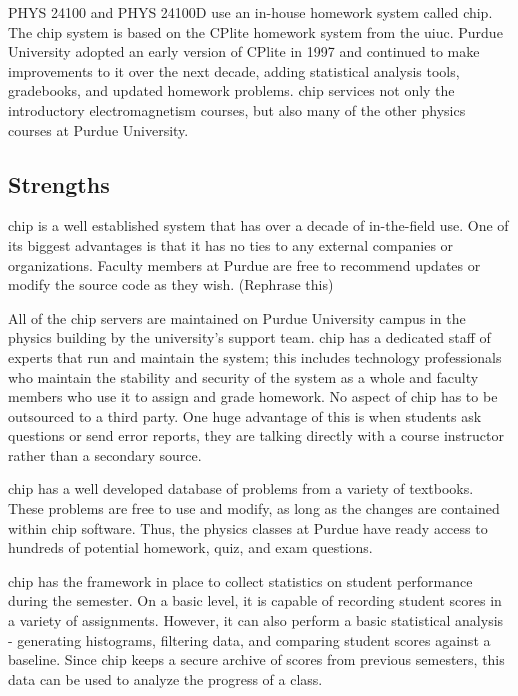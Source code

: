 PHYS 24100 and PHYS 24100D use an in-house homework system called \gls{chip}. The \gls{chip} system is based on the CPlite homework system from the \gls{uiuc}. Purdue University adopted an early version of CPlite in 1997 and continued to make improvements to it over the next decade, adding statistical analysis tools, gradebooks, and updated homework problems. \gls{chip} services not only the introductory electromagnetism courses, but also many of the other physics courses at Purdue University.

\subsection*{Strengths}

\gls{chip} is a well established system that has over a decade of in-the-field use. One of its biggest advantages is that it has no ties to any external companies or organizations. Faculty members at Purdue are free to recommend updates or modify the source code as they wish. (Rephrase this)

All of the \gls{chip} servers are maintained on Purdue University campus in the physics building by the university's support team. \gls{chip} has a dedicated staff of experts that run and maintain the system; this includes technology professionals who maintain the stability and security of the system as a whole and faculty members who use it to assign and grade homework. No aspect of \gls{chip} has to be outsourced to a third party. One huge advantage of this is when students ask questions or send error reports, they are talking directly with a course instructor rather than a secondary source.

\gls{chip} has a well developed database of problems from a variety of textbooks. These problems are free to use and modify, as long as the changes are contained within \gls{chip} software. Thus, the physics classes at Purdue have ready access to hundreds of potential homework, quiz, and exam questions.

\gls{chip} has the framework in place to collect statistics on student performance during the semester. On a basic level, it is capable of recording student scores in a variety of assignments. However, it can also perform a basic statistical analysis - generating histograms, filtering data, and comparing student scores against a baseline. Since \gls{chip} keeps a secure archive of scores from previous semesters, this data can be used to analyze the progress of a class.

